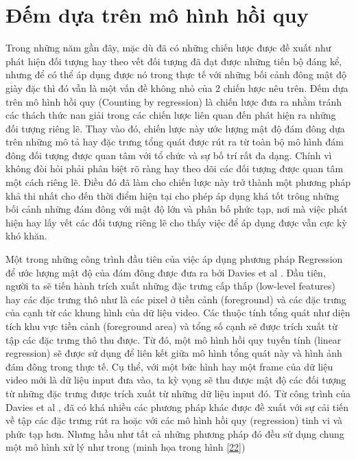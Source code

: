  \section{Đếm dựa trên mô hình hồi quy}
 
	Trong những năm gần đây, mặc dù đã có những chiến lược được đề xuất như phát hiện đối tượng hay theo vết đối tượng đã đạt được những tiến bộ đáng kể, nhưng để có thể áp dụng được nó trong thực tế với những bối cảnh đông mật độ giày đặc thì đó vẫn là một vấn đề không nhỏ của 2 chiến lược nêu trên. Đếm dựa trên mô hình hồi quy (Counting by regression) là chiến lược đưa ra nhằm tránh các thách thức nan giải trong các chiến lược liên quan đến phát hiện ra những đối tượng riêng lẽ. Thay vào đó, chiến lược này ước lượng  mật độ đám đông dựa trên những mô tả hay đặc trưng tổng quát được rút ra từ toàn bộ mô hình đám đông đối tượng được quan tâm với tổ chức và sự bố trí rất đa dạng. Chính vì không đòi hỏi phải phân biệt rõ ràng hay theo dõi các đối tượng được quan tâm một cách riêng lẽ. Điều đó đã làm cho chiến lược này trở thành một phương pháp khả thi nhất cho đến thời điểm hiện tại cho phép áp dụng khá tốt trông những  bối cảnh những đám đông với mật độ lớn và phân bố phức tạp, nơi mà việc phát hiện hay lấy vết các đối tượng riêng lẽ cho thấy việc để áp dụng được vẫn cực kỳ khó khăn. \par 
	Một trong những công trình đầu tiên của việc áp dụng phương pháp Regression để ước lượng mật độ của đám đông được đưa ra bởi Davies et al \cite{davies1995crowd}. Đầu tiên, người ta sẽ tiến hành trích xuất những đặc trưng cấp thấp (low-level features) hay các đặc trưng thô như là các pixel ở tiền cảnh (foreground) và các đặc trưng của cạnh từ các khung hình của dữ liệu video. Các thuộc tính tổng quát như diện tích khu vực tiền cảnh (foreground area) và tổng số cạnh sẽ được trích xuất từ tập các đặc trưng thô thu được. Từ đó, một mô hình hồi quy tuyến tính (linear regression) sẽ được sử dụng để liên kết giữa mô hình tổng quát này và hình ảnh đám đông trong thực tế. Cụ thể,     với một bức hình hay một frame của dữ liệu video mới là dữ liệu input đưa vào, ta kỳ vọng sẽ thu được mật độ các đối tượng từ những đặc trưng được trích xuất từ những dữ liệu input đó. Từ công trình của Davies et al \cite{davies1995crowd}, đã có khá nhiều các phương pháp khác được đề xuất với sự cải tiến về tập các đặc trưng rút ra hoặc với các mô hình hồi quy (regression) tinh vi và phức tạp hơn. Nhưng hầu như tất cả những phương pháp đó đều sử dụng chung một mô hình xử lý như trong \cite{davies1995crowd} (minh họa trong hình \ref{22})

